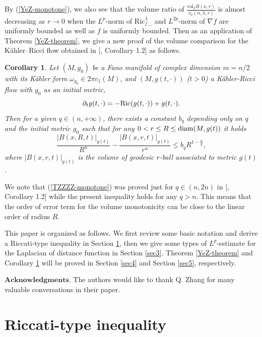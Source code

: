 \documentclass[11pt]{amsart}
\numberwithin{equation}{section}
\newtheorem{corollary}[theorem]{Corollary}
\newcommand{\vol}{\mathrm{vol}}
\begin{document}
   By  (\ref{YeZ-monotone}),  we also see that the volume  ratio of  $\frac{\vol_f B(x,r)}{v_a(n,\lambda,r)}$ is almost
 decreasing    as $r\to 0$ when  the $L^p$-norm of ${\mathrm{Ric}_f^\lambda}_-$ and $L^{2p}$-norm of $\nabla f$ are uniformly bounded as well as  $f$ is uniformly bounded. Then as an application of Theorem \ref{YeZ-theorem}, we give a new proof of the volume comparison for the Kähler–Ricci flow obtained in [\cite{TZZZZ}, Corollary 1.2] as follows. 
 
    \begin{corollary}\label{TZZZZ}
    	Let  $(M, g_0)$  be a Fano manifold of  complex dimension $m=n/2$  with its K\"ahler form $\omega_{g_0}\in 2\pi c_1(M)$,  and $(M, g(t, \cdot))$ ($t>0$)  a  K\"ahler-Ricci flow  with $g_0$ as  an initial metric,
    	\begin{equation}
    	\partial_tg(t,\cdot)=-{\rm Ric}(g(t, \cdot))+g(t,\cdot).  \label{krf}
    	\end{equation}
    	Then  for a given $q\in (n,+\infty)$,   there exists a constant $b_q$ depending only on $q$ and the initial metric $g_0$ such that for any  $0< r\le R \le {\rm diam}(M, g(t))$ it holds
    	\begin{equation}\label{TZZZZ-monotone}
    	\frac{|B(x,R,t)|_{g(t)}}{R^n}-\frac{|B(x,r,t)|_{g(t)}}{r^n}\leq b_qR^{1-\frac{n}{q}},
    	\end{equation}
	where  $|B(x,r,t)|_{g(t)}$ is  the volume of geodesic   $r$-ball associated to metric $g(t)$.
    \end{corollary}

  We note that  (\ref{TZZZZ-monotone}) was   proved  just for $q\in (n, 2n)$
   in [\cite{TZZZZ}, Corollary 1.2] while the present inequality holds for any $q>n$. This means that the  order of error term for the volume monotonicity can be close to the linear order of radius $R$.

    This paper is organized as follows. We first review some basic notation and derive a Riccati-type inequality in Section \ref{sec2}, then we give some types of $L^p$-estimate for the Laplacian of distance function in Section \ref{sec3}. Theorem  \ref{YeZ-theorem} and Corollary \ref{TZZZZ} will be proved in Section \ref{sec4} and Section \ref{sec5},  respectively.

$\mathbf{Acknowledgments.}$ The authors would like to thank Q. Zhang for many valuable conversations in their paper.

\section{Riccati-type inequality}\label{sec2}
\end{document}
